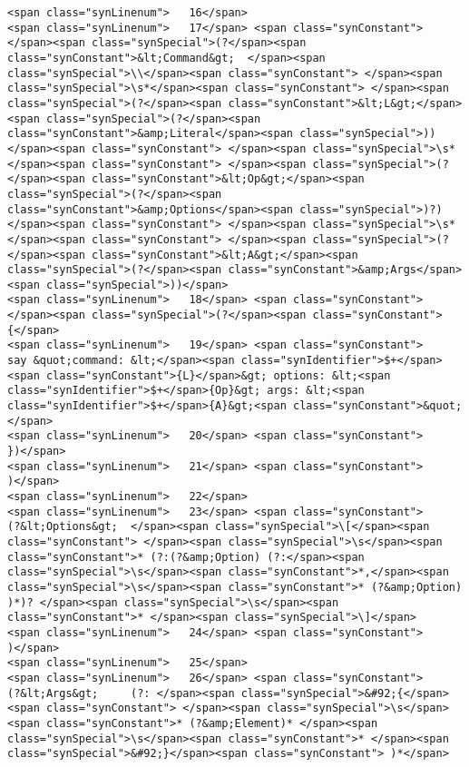 \begin{verbatim}
<span class="synLinenum">   16</span> 
<span class="synLinenum">   17</span> <span class="synConstant">        </span><span class="synSpecial">(?</span><span class="synConstant">&lt;Command&gt;  </span><span class="synSpecial">\\</span><span class="synConstant"> </span><span class="synSpecial">\s*</span><span class="synConstant"> </span><span class="synSpecial">(?</span><span class="synConstant">&lt;L&gt;</span><span class="synSpecial">(?</span><span class="synConstant">&amp;Literal</span><span class="synSpecial">))</span><span class="synConstant"> </span><span class="synSpecial">\s*</span><span class="synConstant"> </span><span class="synSpecial">(?</span><span class="synConstant">&lt;Op&gt;</span><span class="synSpecial">(?</span><span class="synConstant">&amp;Options</span><span class="synSpecial">)?)</span><span class="synConstant"> </span><span class="synSpecial">\s*</span><span class="synConstant"> </span><span class="synSpecial">(?</span><span class="synConstant">&lt;A&gt;</span><span class="synSpecial">(?</span><span class="synConstant">&amp;Args</span><span class="synSpecial">))</span>
<span class="synLinenum">   18</span> <span class="synConstant">           </span><span class="synSpecial">(?</span><span class="synConstant">{</span>
<span class="synLinenum">   19</span> <span class="synConstant">              say &quot;command: &lt;</span><span class="synIdentifier">$+</span><span class="synConstant">{L}</span>&gt; options: &lt;<span class="synIdentifier">$+</span>{Op}&gt; args: &lt;<span class="synIdentifier">$+</span>{A}&gt;<span class="synConstant">&quot;</span>
<span class="synLinenum">   20</span> <span class="synConstant">           })</span>
<span class="synLinenum">   21</span> <span class="synConstant">        )</span>
<span class="synLinenum">   22</span> 
<span class="synLinenum">   23</span> <span class="synConstant">        (?&lt;Options&gt;  </span><span class="synSpecial">\[</span><span class="synConstant"> </span><span class="synSpecial">\s</span><span class="synConstant">* (?:(?&amp;Option) (?:</span><span class="synSpecial">\s</span><span class="synConstant">*,</span><span class="synSpecial">\s</span><span class="synConstant">* (?&amp;Option) )*)? </span><span class="synSpecial">\s</span><span class="synConstant">* </span><span class="synSpecial">\]</span>
<span class="synLinenum">   24</span> <span class="synConstant">        )</span>
<span class="synLinenum">   25</span> 
<span class="synLinenum">   26</span> <span class="synConstant">        (?&lt;Args&gt;     (?: </span><span class="synSpecial">&#92;{</span><span class="synConstant"> </span><span class="synSpecial">\s</span><span class="synConstant">* (?&amp;Element)* </span><span class="synSpecial">\s</span><span class="synConstant">* </span><span class="synSpecial">&#92;}</span><span class="synConstant"> )*</span>

\end{verbatim}
